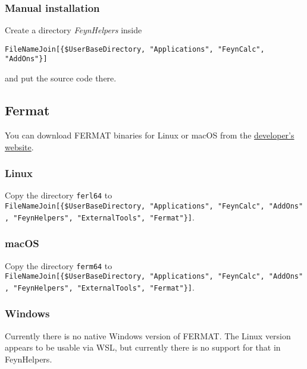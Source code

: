 \documentclass[../FeynHelpersManual.tex]{subfiles}
\begin{document}
\hypertarget{manual-installation}{%
\subsubsection{Manual installation}\label{manual-installation}}

Create a directory \emph{FeynHelpers} inside

\begin{verbatim}
FileNameJoin[{$UserBaseDirectory, "Applications", "FeynCalc", "AddOns"}]
\end{verbatim}

and put the source code there.

\hypertarget{fermat}{%
\subsection{Fermat}\label{fermat}}

You can download FERMAT binaries for Linux or macOS from the
\href{https://home.bway.net/lewis/zip.html}{developer's website}.

\hypertarget{linux}{%
\subsubsection{Linux}\label{linux}}

Copy the directory \texttt{ferl64} to
\texttt{FileNameJoin[\allowbreak{}\{\allowbreak{}\$UserBaseDirectory,\ \allowbreak{}"Applications",\ \allowbreak{}"FeynCalc",\ \allowbreak{}"AddOns",\ \allowbreak{}"FeynHelpers",\ \allowbreak{}"ExternalTools",\ \allowbreak{}"Fermat"\}]}.

\hypertarget{macos}{%
\subsubsection{macOS}\label{macos}}

Copy the directory \texttt{ferm64} to
\texttt{FileNameJoin[\allowbreak{}\{\allowbreak{}\$UserBaseDirectory,\ \allowbreak{}"Applications",\ \allowbreak{}"FeynCalc",\ \allowbreak{}"AddOns",\ \allowbreak{}"FeynHelpers",\ \allowbreak{}"ExternalTools",\ \allowbreak{}"Fermat"\}]}.

\hypertarget{windows}{%
\subsubsection{Windows}\label{windows}}

Currently there is no native Windows version of FERMAT. The Linux
version appears to be usable via WSL, but currently there is no support
for that in FeynHelpers.
\end{document}
